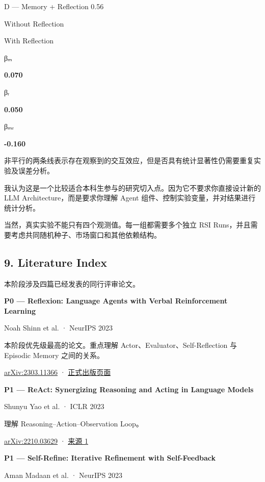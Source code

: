 D --- Memory + Reflection 0.56


Without Reflection

With Reflection

βₘ

\textbf{0.070}

βᵣ

\textbf{0.050}

βₘᵣ

\textbf{-0.160}

非平行的两条线表示存在观察到的交互效应，但是否具有统计显著性仍需要重复实验及误差分析。

我认为这是一个比较适合本科生参与的研究切入点。因为它不要求你直接设计新的 LLM Architecture，而是要求你理解 Agent 组件、控制实验变量，并对结果进行统计分析。

当然，真实实验不能只有四个观测值。每一组都需要多个独立 RSI Runs，并且需要考虑共同随机种子、市场窗口和其他依赖结构。

\hypertarget{part-3-34-0001-literature-index}{%
\subsection{9. Literature Index}\label{part-3-34-0001-literature-index}}

本阶段涉及四篇已经发表的同行评审论文。

\textbf{P0 --- Reflexion: Language Agents with Verbal Reinforcement Learning}

Noah Shinn et al. · NeurIPS 2023

本阶段优先级最高的论文。重点理解 Actor、Evaluator、Self-Reflection 与 Episodic Memory 之间的关系。

\href{https://arxiv.org/abs/2303.11366}{arXiv:2303.11366} · \href{https://proceedings.neurips.cc/paper_files/paper/2023/hash/1b44b878bb782e6954cd888628510e90-Abstract-Conference.html}{正式出版页面}

\textbf{P1 --- ReAct: Synergizing Reasoning and Acting in Language Models}

Shunyu Yao et al. · ICLR 2023

理解 Reasoning--Action--Observation Loop。

\href{https://arxiv.org/abs/2210.03629}{arXiv:2210.03629} · \href{https://arxiv.org/abs/2210.03629}{来源 1}

\textbf{P1 --- Self-Refine: Iterative Refinement with Self-Feedback}

Aman Madaan et al. · NeurIPS 2023

